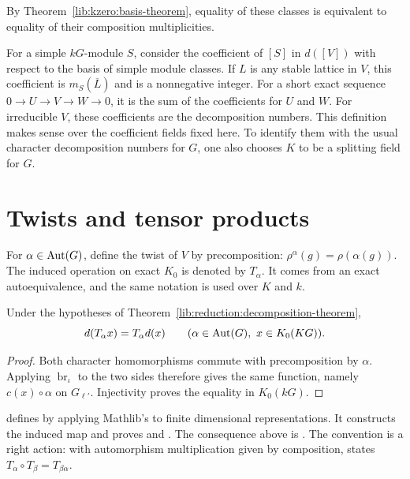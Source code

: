 By Theorem~\ref{lib:kzero:basis-theorem}, equality of these
classes is equivalent to equality of their composition multiplicities.

\begin{example}
\label{lib:reduction:coefficient-example}
For a simple $kG$-module $S$, consider the coefficient of $[S]$ in
$d([V])$ with respect to the basis of simple module classes. If $L$ is any
stable lattice in $V$, this coefficient is $m_S(\overline L)$ and is a nonnegative integer.
For a short exact sequence $0\to U\to V\to W\to0$, it is the sum of
the coefficients for $U$ and $W$. For irreducible $V$, these coefficients
are the decomposition numbers.
This definition makes sense over the coefficient fields fixed here. To
identify them with the usual character decomposition numbers for $G$, one
also chooses $K$ to be a splitting field for $G$.
\end{example}

\section{Twists and tensor products}
\label{lib:reduction:naturality}

For $\alpha\in\operatorname{Aut}(G)$, define the twist of $V$ by precomposition:
$\rho^{\alpha}(g)=\rho(\alpha(g))$. The induced operation on exact
$K_0$ is denoted by $T_{\alpha}$. It comes from an exact autoequivalence,
and the same notation is used over $K$ and $k$.

\begin{proposition}
\label{lib:reduction:twist-theorem}
Under the hypotheses of Theorem~\ref{lib:reduction:decomposition-theorem},
\[
 d(T_{\alpha}x)=T_{\alpha}d(x)
 \qquad (\alpha\in\operatorname{Aut}(G),\ x\in K_0(KG)).
\]
\end{proposition}
\begin{proof}
Both character homomorphisms commute with precomposition by $\alpha$.
Applying $\operatorname{br}_{\iota}$ to the two sides therefore gives
the same function, namely $c(x)\circ\alpha$ on $G_{\ell'}$.
Injectivity proves the equality in $K_0(kG)$.
\end{proof}

\begin{implementation}
 defines 
by applying Mathlib's  to finite dimensional
representations. It constructs the induced map  and proves
 and
. The consequence above is
.
The convention is a right action: with automorphism multiplication given
by composition,  states
$T_{\alpha}\circ T_{\beta}=T_{\beta\alpha}$.
\end{implementation}


